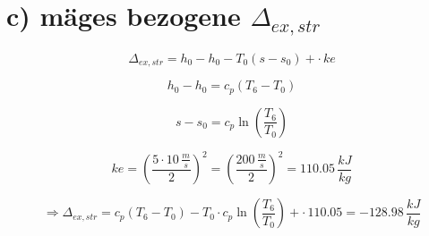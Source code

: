 \section*{c) mäges bezogene $\Delta_{ex,str}$}

\[
\Delta_{ex,str} = h_0 - h_0 - T_0 (s - s_0) + \cdot \, ke
\]

\[
h_0 - h_0 = c_p (T_6 - T_0)
\]

\[
s - s_0 = c_p \ln \left( \frac{T_6}{T_0} \right)
\]

\[
ke = \left( \frac{5 \cdot 10 \, \frac{m}{s}}{2} \right)^2 = \left( \frac{200 \, \frac{m}{s}}{2} \right)^2 = 110.05 \, \frac{kJ}{kg}
\]

\[
\Rightarrow \Delta_{ex,str} = c_p (T_6 - T_0) - T_0 \cdot c_p \ln \left( \frac{T_6}{T_0} \right) + \cdot \, 110.05 = -128.98 \, \frac{kJ}{kg}
\]